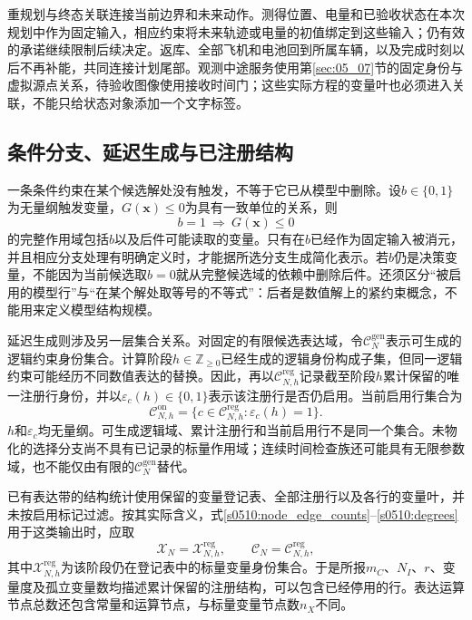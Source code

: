 重规划与终态关联连接当前边界和未来动作。测得位置、电量和已验收状态在本次规划中作为固定输入，相应约束将未来轨迹或电量的初值绑定到这些输入；仍有效的承诺继续限制后续决定。返库、全部飞机和电池回到所属车辆，以及完成时刻以后不再补能，共同连接计划尾部。观测中途服务使用第\ref{sec:05_07}节的固定身份与虚拟源点关系，待验收图像使用接收时间门；这些实际方程的变量叶也必须进入关联，不能只给状态对象添加一个文字标签。

\subsection{条件分支、延迟生成与已注册结构}

一条条件约束在某个候选解处没有触发，不等于它已从模型中删除。设$b\in\{0,1\}$为无量纲触发变量，$G(\mathbf x)\le0$为具有一致单位的关系，则
\begin{equation}
 b=1\ \Longrightarrow\ G(\mathbf x)\le0
 \label{s0510:conditional_relation}
\end{equation}
的完整作用域包括$b$以及后件可能读取的变量。只有在$b$已经作为固定输入被消元，并且相应分支处理有明确定义时，才能据所选分支生成简化表示。若$b$仍是决策变量，不能因为当前候选取$b=0$就从完整候选域的依赖中删除后件。还须区分“被启用的模型行”与“在某个解处取等号的不等式”：后者是数值解上的紧约束概念，不能用来定义模型结构规模。

延迟生成则涉及另一层集合关系。对固定的有限候选表达域，令$\mathcal C_N^{\mathrm{gen}}$表示可生成的逻辑约束身份集合。计算阶段$h\in\mathbb Z_{\ge0}$已经生成的逻辑身份构成子集，但同一逻辑约束可能经历不同数值表达的替换。因此，再以$\mathcal C_{N,h}^{\mathrm{reg}}$记录截至阶段$h$累计保留的唯一注册行身份，并以$\varepsilon_c(h)\in\{0,1\}$表示该注册行是否仍启用。当前启用行集合为
\begin{equation}
 \mathcal C_{N,h}^{\mathrm{on}}
 =\{c\in\mathcal C_{N,h}^{\mathrm{reg}}:
                    \varepsilon_c(h)=1\}.
 \label{s0510:enabled_rows}
\end{equation}
$h$和$\varepsilon_c$均无量纲。可生成逻辑域、累计注册行和当前启用行不是同一个集合。未物化的选择分支尚不具有已记录的标量作用域；连续时间检查族还可能具有无限参数域，也不能仅由有限的$\mathcal C_N^{\mathrm{gen}}$替代。

已有表达带的结构统计使用保留的变量登记表、全部注册行以及各行的变量叶，并未按启用标记过滤。按其实际含义，式\eqref{s0510:node_edge_counts}--\eqref{s0510:degrees}用于这类输出时，应取
\begin{equation}
 \mathcal X_N=\mathcal X_{N,h}^{\mathrm{reg}},
 \qquad
 \mathcal C_N=\mathcal C_{N,h}^{\mathrm{reg}},
 \label{s0510:registered_convention}
\end{equation}
其中$\mathcal X_{N,h}^{\mathrm{reg}}$为该阶段仍在登记表中的标量变量身份集合。于是所报$m_C$、$N_I$、$r$、变量度及孤立变量数均描述累计保留的注册结构，可以包含已经停用的行。表达运算节点总数还包含常量和运算节点，与标量变量节点数$n_X$不同。

